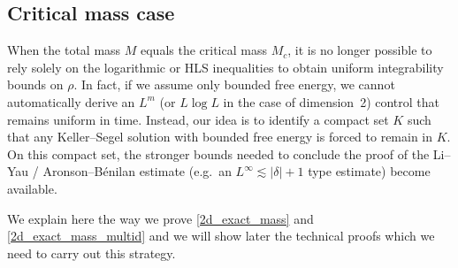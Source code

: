 \documentclass[11pt,a4paper]{article}
\numberwithin{equation}{section}
\theoremstyle{plain}
\theoremstyle{remark}
\begin{document}
\subsection{Critical mass case}

When the total mass $M$ equals the critical mass $M_c$, it is no longer possible to rely solely on the logarithmic or HLS inequalities to obtain uniform integrability bounds on $\rho$. In fact, if we assume only bounded free energy, we cannot automatically derive an $L^m$ (or $L \log L$ in the case of dimension~2) control that remains uniform in time. Instead, our idea is to identify a compact set $K$ such that any Keller--Segel solution with bounded free energy is forced to remain in $K$. On this compact set, the stronger bounds needed to conclude the proof of the Li--Yau /  Aronson--B\'enilan estimate (e.g.\ an $L^\infty\lesssim |\delta|+1$ type estimate) become available.

We explain here the way we prove \ref{2d_exact_mass} and \ref{2d_exact_mass_multid}  and we will show later the technical proofs which we need to carry out this strategy.
\end{document}
